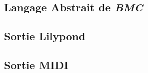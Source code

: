 \subsection{Langage Abstrait de \textit{BMC}}


\subsection{Sortie Lilypond}


\subsection{Sortie MIDI}


